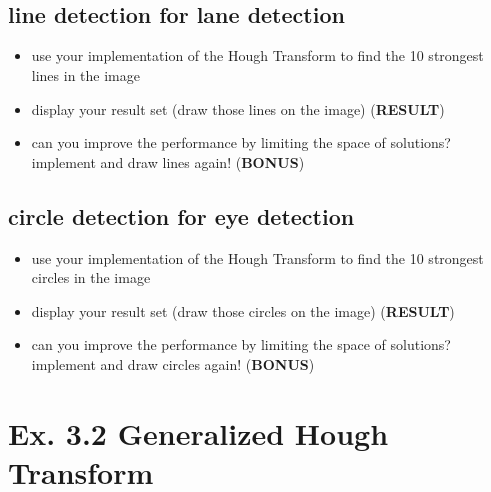 \documentclass[11pt]{article}
\providecommand{\tightlist}{%
      \setlength{\itemsep}{0pt}\setlength{\parskip}{0pt}}
\begin{document}
    \begin{center}
    \end{center}
    { \hspace*{\fill} \\}
    
    \begin{center}
    \end{center}
    { \hspace*{\fill} \\}
    
    \hypertarget{line-detection-for-lane-detection}{%
\subsection{line detection for lane
detection}\label{line-detection-for-lane-detection}}

\begin{itemize}
\tightlist
\item
  use your implementation of the Hough Transform to find the 10
  strongest lines in the image
\item
  display your result set (draw those lines on the image)
  (\textbf{RESULT})
\item
  can you improve the performance by limiting the space of solutions?
  implement and draw lines again! (\textbf{BONUS})
\end{itemize}

    \hypertarget{circle-detection-for-eye-detection}{%
\subsection{circle detection for eye
detection}\label{circle-detection-for-eye-detection}}

\begin{itemize}
\tightlist
\item
  use your implementation of the Hough Transform to find the 10
  strongest circles in the image
\item
  display your result set (draw those circles on the image)
  (\textbf{RESULT})
\item
  can you improve the performance by limiting the space of solutions?
  implement and draw circles again! (\textbf{BONUS})
\end{itemize}

    \hypertarget{ex.-3.2-generalized-hough-transform}{%
\section{Ex. 3.2 Generalized Hough
Transform}\label{ex.-3.2-generalized-hough-transform}}
\end{document}
